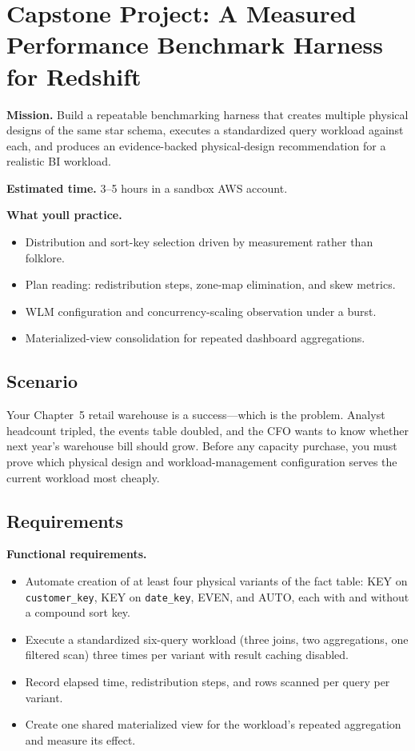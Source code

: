 \section{Capstone Project: A Measured Performance Benchmark Harness for Redshift}\label{sec:ch6-capstone}

\begin{capstonebox}
\textbf{Mission.} Build a repeatable benchmarking harness that creates multiple physical designs of the same star schema, executes a standardized query workload against each, and produces an evidence-backed physical-design recommendation for a realistic BI workload.

\textbf{Estimated time.} 3--5 hours in a sandbox AWS account.

\textbf{What you\textquotesingle{}ll practice.}
\begin{itemize}
    \item Distribution and sort-key selection driven by measurement rather than folklore.
    \item Plan reading: redistribution steps, zone-map elimination, and skew metrics.
    \item WLM configuration and concurrency-scaling observation under a burst.
    \item Materialized-view consolidation for repeated dashboard aggregations.
\end{itemize}
\end{capstonebox}

\subsection*{Scenario}
Your Chapter~5 retail warehouse is a success---which is the problem. Analyst headcount tripled, the events table doubled, and the CFO wants to know whether next year's warehouse bill should grow. Before any capacity purchase, you must prove which physical design and workload-management configuration serves the current workload most cheaply.

\subsection*{Requirements}
\textbf{Functional requirements.}
\begin{itemize}
    \item Automate creation of at least four physical variants of the fact table: KEY on \texttt{customer\_key}, KEY on \texttt{date\_key}, EVEN, and AUTO, each with and without a compound sort key.
    \item Execute a standardized six-query workload (three joins, two aggregations, one filtered scan) three times per variant with result caching disabled.
    \item Record elapsed time, redistribution steps, and rows scanned per query per variant.
    \item Create one shared materialized view for the workload's repeated aggregation and measure its effect.
\end{itemize}

